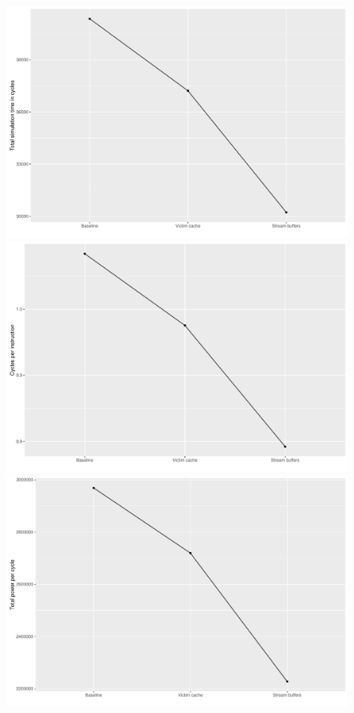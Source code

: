 \documentclass[10pt]{scrartcl}
\begin{document}
\begin{figure}
  \includegraphics[width=\linewidth]{./Plots/gcc_1.pdf}
\endminipage\hfill
{}
  \includegraphics[width=\linewidth]{./Plots/gcc_2.pdf}
\endminipage\hfill
{}%
  \includegraphics[width=\linewidth]{./Plots/gcc_3.pdf}

\end{figure}
\end{document}
